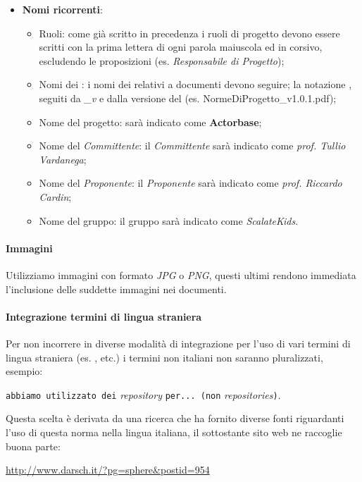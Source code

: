 \documentclass{scalatekids-article}
\begin{document}
\begin{itemize}
    \item \textbf{Nomi ricorrenti}:
        \begin{itemize}
            \item Ruoli: come già scritto in precedenza i ruoli di progetto devono essere scritti con la prima lettera di ogni parola maiuscola ed in corsivo, escludendo le proposizioni (es. \textit{Responsabile di Progetto});
            \item Nomi dei : i nomi dei  relativi a documenti devono seguire;
                la notazione \textit{}, seguiti da \textit{\_v} e dalla
                versione del  (es. NormeDiProgetto\_v1.0.1.pdf);
            \item Nome del progetto: sarà indicato come \textbf{Actorbase};
            \item Nome del \textit{Committente}: il \textit{Committente} sarà indicato come \textit{prof. Tullio Vardanega};
            \item Nome del \textit{Proponente}: il \textit{Proponente} sarà indicato come \textit{prof. Riccardo Cardin};
            \item Nome del gruppo: il gruppo sarà indicato come \textit{ScalateKids}.
        \end{itemize}
\end{itemize}

\paragraph{Immagini}

Utilizziamo immagini con formato \textit{JPG} o \textit{PNG}, questi ultimi rendono immediata l'inclusione delle suddette immagini nei documenti.

\paragraph{Integrazione termini di lingua straniera}

Per non incorrere in diverse modalità di integrazione per l'uso di vari termini
di lingua straniera (es. ,  etc.) i termini non italiani non saranno pluralizzati, esempio:\\
\begin{center}
    \verb=abbiamo utilizzato dei= \textit{repository} \verb=per... (non= \textit{repositories}\verb=)=.
\end{center}
Questa scelta è derivata da una ricerca che ha fornito diverse fonti riguardanti l'uso di questa norma nella lingua italiana, il sottostante sito web ne raccoglie buona parte:\\
\begin{center}
    \url{http://www.darsch.it/?pg=sphere&postid=954}
\end{center}
\end{document}
